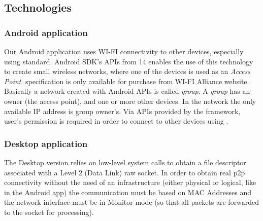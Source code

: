 \subsection{Technologies}

\subsubsection{Android application}
Our Android application uses WI-FI connectivity to other devices, especially using \direct standard. Android SDK's APIs from 14 enables the use of this technology to create small wireless networks, where one of the devices is used as an \emph{Access Point}. \direct specification is only available for purchase from WI-FI Alliance\textsuperscript{\texttrademark} website\cite{wifi_direct}.
Basically a network created with Android \direct APIs is called \emph{group}. A \emph{group} has an owner (the access point), and one or more other devices. In the network the only available IP address is group owner's. 
Via APIs provided by the framework, user's permission is required in order to connect to other devices using \direct.

\subsubsection{Desktop application}
The Desktop version relies on low-level system calls to obtain a file descriptor associated with a Level 2 (Data Link) raw socket. In order to obtain real p2p connectivity without the need of an infrastructure (either physical or logical, like in the Android app) the communication must be based on MAC Addresses and the network interface must be in Monitor mode (so that all packets are forwarded to the socket for processing).
